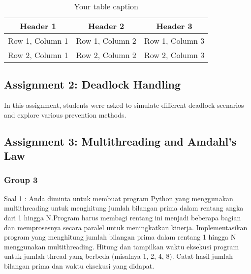 \documentclass[12pt]{article}
\begin{document}
\begin{table}[htbp] %
    \centering
    \begin{tabular}{|c|c|c|} %
    \hline
    Header 1 & Header 2 & Header 3 \\ %
    \hline
    Row 1, Column 1 & Row 1, Column 2 & Row 1, Column 3 \\ %
    \hline
    Row 2, Column 1 & Row 2, Column 2 & Row 2, Column 3 \\ %
    \hline
    \end{tabular}
    \caption{Your table caption} %
    \label{tab:your_label} %
\end{table}

\subsection{Assignment 2: Deadlock Handling}
In this assignment, students were asked to simulate different deadlock scenarios and explore various prevention methods.

\subsection{Assignment 3: Multithreading and Amdahl's Law}
\subsubsection{Group 3}
Soal 1 :
Anda diminta untuk membuat program Python yang menggunakan multithreading untuk menghitung jumlah bilangan prima dalam rentang angka dari 1 hingga 
N.Program harus membagi rentang ini menjadi beberapa bagian dan memprosesnya secara paralel untuk meningkatkan kinerja. Implementasikan program yang menghitung jumlah bilangan prima dalam rentang 1 hingga 
N menggunakan multithreading. Hitung dan tampilkan waktu eksekusi program untuk jumlah thread yang berbeda (misalnya 1, 2, 4, 8). Catat hasil jumlah bilangan prima dan waktu eksekusi yang didapat.
\end{document}
